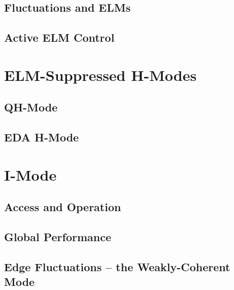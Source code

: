 \subsection{Fluctuations and ELMs}\label{subsec:hcr_elmy_fluct}

\subsection{Active ELM Control}\label{subsec:hcr_elmy_control}

\nicesectionending

\section{ELM-Suppressed H-Modes}\label{sec:hcr_elmsuppressed}

\subsection{QH-Mode}\label{subsec:hcr_qh}

\subsection{EDA H-Mode}\label{subsec:hcr_eda}

\nicesectionending

\section{I-Mode}\label{sec:hcr_imode}

\subsection{Access and Operation}\label{subsec:hcr_imode_access}

\subsection{Global Performance}\label{subsec:hcr_imode_performance}

\subsection{Edge Fluctuations -- the Weakly-Coherent Mode}\label{subsec:hcr_imode_wcm}

\nicechapterending


